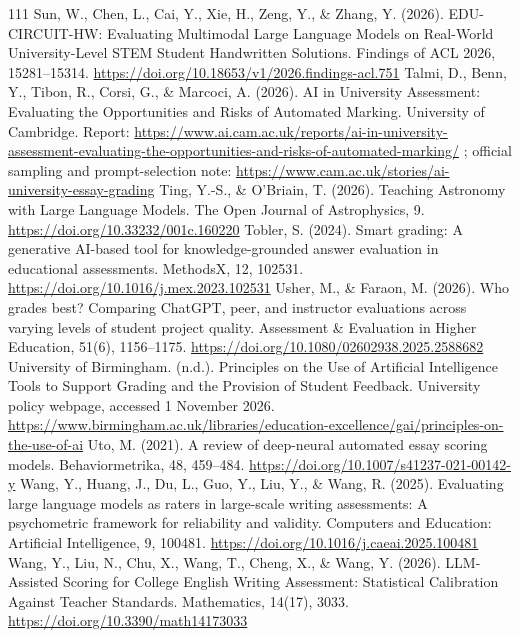 \begin{thebibliography}{111}
 Sun, W., Chen, L., Cai, Y., Xie, H., Zeng, Y., \& Zhang, Y. (2026). EDU-CIRCUIT-HW: Evaluating Multimodal Large Language Models on Real-World University-Level STEM Student Handwritten Solutions. Findings of ACL 2026, 15281--15314. \url{https://doi.org/10.18653/v1/2026.findings-acl.751}
 Talmi, D., Benn, Y., Tibon, R., Corsi, G., \& Marcoci, A. (2026). AI in University Assessment: Evaluating the Opportunities and Risks of Automated Marking. University of Cambridge. Report: \url{https://www.ai.cam.ac.uk/reports/ai-in-university-assessment-evaluating-the-opportunities-and-risks-of-automated-marking/} ; official sampling and prompt-selection note: \url{https://www.cam.ac.uk/stories/ai-university-essay-grading}
 Ting, Y.-S., \& O'Briain, T. (2026). Teaching Astronomy with Large Language Models. The Open Journal of Astrophysics, 9. \url{https://doi.org/10.33232/001c.160220}
 Tobler, S. (2024). Smart grading: A generative AI-based tool for knowledge-grounded answer evaluation in educational assessments. MethodsX, 12, 102531. \url{https://doi.org/10.1016/j.mex.2023.102531}
 Usher, M., \& Faraon, M. (2026). Who grades best? Comparing ChatGPT, peer, and instructor evaluations across varying levels of student project quality. Assessment \& Evaluation in Higher Education, 51(6), 1156--1175. \url{https://doi.org/10.1080/02602938.2025.2588682}
 University of Birmingham. (n.d.). Principles on the Use of Artificial Intelligence Tools to Support Grading and the Provision of Student Feedback. University policy webpage, accessed 1 November 2026. \url{https://www.birmingham.ac.uk/libraries/education-excellence/gai/principles-on-the-use-of-ai}
 Uto, M. (2021). A review of deep-neural automated essay scoring models. Behaviormetrika, 48, 459--484. \url{https://doi.org/10.1007/s41237-021-00142-y}
 Wang, Y., Huang, J., Du, L., Guo, Y., Liu, Y., \& Wang, R. (2025). Evaluating large language models as raters in large-scale writing assessments: A psychometric framework for reliability and validity. Computers and Education: Artificial Intelligence, 9, 100481. \url{https://doi.org/10.1016/j.caeai.2025.100481}
 Wang, Y., Liu, N., Chu, X., Wang, T., Cheng, X., \& Wang, Y. (2026). LLM-Assisted Scoring for College English Writing Assessment: Statistical Calibration Against Teacher Standards. Mathematics, 14(17), 3033. \url{https://doi.org/10.3390/math14173033}

\end{thebibliography}
